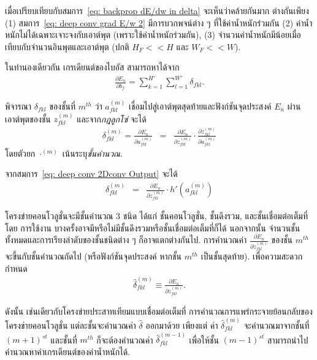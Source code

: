 เมื่อเปรียบเทียบกับสมการ~\ref{eq: backprop dE/dw in delta} %
จะเห็นว่าคล้ายกันมาก
ต่างกันเพียง
(1) สมการ~\ref{eq: deep conv grad E/w 2} มีการบวกพจน์ต่าง ๆ ที่ใช้ค่าน้ำหนักร่วมกัน
(2) ค่าน้ำหนักไม่ได้เฉพาะเจาะจงกับเอาต์พุต (เพราะใช้ค่าน้ำหนักร่วมกัน),
(3) จำนวนค่าน้ำหนักมีน้อยเมื่อเทียบกับจำนวนอินพุตและเอาต์พุต (ปกติ $H_F << H$ และ $W_F << W$).

ในทำนองเดียวกัน เกรเดียนต์ของไบอัส สามารถหาได้จาก
\begin{eqnarray}
\frac{\partial E_n}{\partial b_f} = 
\sum_{k=1}^{H'} \sum_{l=1}^{W'} \delta_{fkl} 
\label{eq: deep conv grad E/b} .
\end{eqnarray}

พิจารณา $\delta_{fkl}$ ของชั้นที่ $m^{th}$ ว่า 
$a_{fkl}^{(m)}$ เชื่อมไปสู่เอาต์พุตสุดท้ายและฟังก์ชันจุดประสงค์ $E_n$ ผ่านเอาต์พุตของชั้น $z_{fkl}^{(m)}$ และจาก\textit{กฎลูกโซ่} จะได้
\begin{eqnarray}
\delta_{fkl}^{(m)} = \frac{\partial E_n}{\partial a_{fkl}^{(m)}}
&=& \frac{\partial E_n}{\partial z_{fkl}^{(m)}} \cdot \frac{\partial z_{fkl}^{(m)}}{\partial a_{fkl}^{(m)}}
\nonumber
\end{eqnarray}
โดยตัวยก $\cdot^{(m)}$ เน้นระบุ\textit{ชั้นคำนวณ}.

จากสมการ~\ref{eq: deep conv 2Dconv Output} จะได้
\begin{eqnarray}
\delta_{fkl}^{(m)}
&=& \frac{\partial E_n}{\partial z_{fkl}^{(m)}} \cdot h'\left(a_{fkl}^{(m)}\right)
\label{eq: deep conv grad delta 1}
\end{eqnarray}

โครงข่ายคอนโวลูชั่นจะมีชั้นคำนวณ $3$ ชนิด ได้แก่ ชั้นคอนโวลูชั่น, ชั้นดึงรวม, และชั้นเชื่อมต่อเต็มที่
โดย การใช้งาน บางครั้งอาจมีหรือไม่มีชั้นดึงรวมหรือชั้นเชื่อมต่อเต็มที่ก็ได้
นอกจากนั้น จำนวนชั้นทั้งหมดและการเรียงลำดับของชั้นชนิดต่าง ๆ ก็อาจแตกต่างกันไป.
การคำนวณค่า $\frac{\partial E_n}{\partial z_{fkl}^{(m)}}$ ของชั้น $m^{th}$ จะขึ้นกับชั้นคำนวณถัดไป (หรือฟังก์ชันจุดประสงค์ หากชั้น $m^{th}$ เป็นชั้นสุดท้าย).
เพื่อความสะดวก กำหนด
\begin{eqnarray}
\hat{\delta}_{fkl}^{(m)}
\equiv
\frac{\partial E_n}{\partial z_{fkl}^{(m)}}
\label{eq: deep conv grad delta hat} .
\end{eqnarray}

ดังนั้น เช่นเดียวกับโครงข่ายประสาทเทียมแบบเชื่อมต่อเต็มที่
การคำนวณการแพร่กระจายย้อนกลับของโครงข่ายคอนโวลูชั่น แต่ละชั้นจะคำนวณค่า $\hat{\delta}$ ออกมาด้วย
เพียงแต่ ค่า $\hat{\delta}_{fkl}^{(m)}$ จะคำนวณมาจากชั้นที่ $(m+1)^{st}$
และชั้นที่ $m^{th}$ ก็จะต้องคำนวณค่า $\hat{\delta}_{fkl}^{(m-1)}$ เพื่อให้ชั้น $(m-1)^{st}$ สามารถนำไปคำนวณหาค่าเกรเดียนต์ของค่าน้ำหนักได้.

